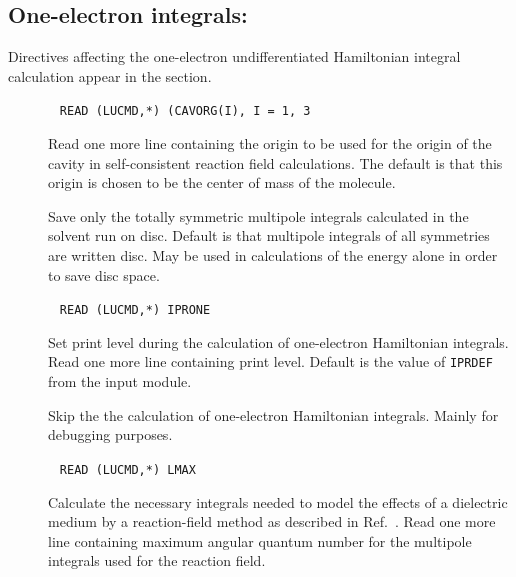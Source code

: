 \subsection{One-electron integrals: }

Directives affecting the one-electron undifferentiated Hamiltonian
integral calculation appear in the  section.
\begin{description}
\item[]\verb| |\newline
\verb|READ (LUCMD,*) (CAVORG(I), I = 1, 3|

Read one more line containing the origin to be used for the origin of
the cavity in self-consistent reaction field
calculations. The default
is that this origin is chosen to be the center of mass of the molecule.

\item[] Save only the totally symmetric multipole integrals
calculated in the solvent run on disc. Default is that multipole
integrals of all symmetries are written disc. May be used in
calculations of the energy alone in order to save disc space.

\item[]\verb| |\newline
\verb|READ (LUCMD,*) IPRONE|

Set print level during the calculation of one-electron Hamiltonian
integrals.  Read one more line containing print level. Default is
the value of \verb|IPRDEF| from the  input module.

\item[] Skip the the calculation of one-electron Hamiltonian
integrals. Mainly for debugging purposes.

\item[]\verb| |\newline
\verb|READ (LUCMD,*) LMAX|


Calculate the necessary integrals needed to model the effects of a
dielectric medium by a
reaction-field method as
described in
Ref.~\cite{kvmhahjajthjcp89}.  Read one more line containing maximum
angular quantum
number for the multipole integrals used for
the reaction field.
\end{description}

